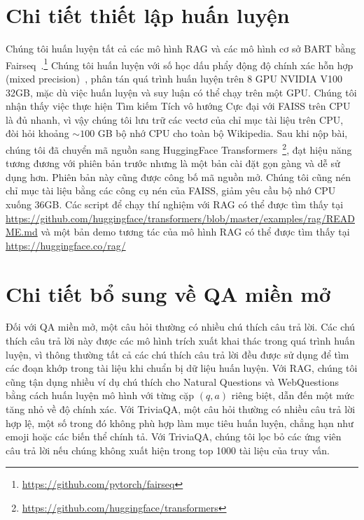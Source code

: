 \documentclass[10pt,letterpaper]{article}
\newcounter{tnote}
\begin{document}
\section{Chi tiết thiết lập huấn luyện}

Chúng tôi huấn luyện tất cả các mô hình RAG và các mô hình cơ sở BART bằng
Fairseq~\cite{b45}.\footnote{\url{https://github.com/pytorch/fairseq}} Chúng
tôi huấn luyện với số học dấu phẩy động độ chính xác hỗn hợp (mixed
precision)~\cite{b40}, phân tán quá trình huấn luyện trên 8 GPU NVIDIA V100
32GB, mặc dù việc huấn luyện và suy luận có thể chạy trên một GPU. Chúng tôi
nhận thấy việc thực hiện Tìm kiếm Tích vô hướng Cực đại với FAISS trên CPU là
đủ nhanh, vì vậy chúng tôi lưu trữ các vectơ của chỉ mục tài liệu trên CPU, đòi
hỏi khoảng ${\sim}100$ GB bộ nhớ CPU cho toàn bộ Wikipedia. Sau khi nộp bài,
chúng tôi đã chuyển mã nguồn sang HuggingFace
Transformers~\cite{b66}\footnote{\url{https://github.com/huggingface/transformers}},
đạt hiệu năng tương đương với phiên bản trước nhưng là một bản cài đặt gọn gàng
và dễ sử dụng hơn. Phiên bản này cũng được công bố mã nguồn mở. Chúng tôi cũng
nén chỉ mục tài liệu bằng các công cụ nén của FAISS, giảm yêu cầu bộ nhớ CPU
xuống 36GB. Các script để chạy thí nghiệm với RAG có thể được tìm thấy tại
\url{https://github.com/huggingface/transformers/blob/master/examples/rag/README.md}
và một bản demo tương tác của mô hình RAG có thể được tìm thấy tại
\url{https://huggingface.co/rag/}

\section{Chi tiết bổ sung về QA miền mở}
\label{app:odqa}

Đối với QA miền mở, một câu hỏi thường có nhiều chú thích câu trả lời. Các chú
thích câu trả lời này được các mô hình trích xuất khai thác trong quá trình
huấn luyện, vì thông thường tất cả các chú thích câu trả lời đều được sử dụng
để tìm các đoạn khớp trong tài liệu khi chuẩn bị dữ liệu huấn luyện. Với RAG,
chúng tôi cũng tận dụng nhiều ví dụ chú thích cho Natural Questions và
WebQuestions bằng cách huấn luyện mô hình với từng cặp $(q,a)$ riêng biệt, dẫn
đến một mức tăng nhỏ về độ chính xác. Với TriviaQA, một câu hỏi thường có nhiều
câu trả lời hợp lệ, một số trong đó không phù hợp làm mục tiêu huấn luyện,
chẳng hạn như emoji hoặc các biến thể chính tả. Với TriviaQA, chúng tôi lọc bỏ
các ứng viên câu trả lời nếu chúng không xuất hiện trong top 1000 tài liệu của
truy vấn.
\end{document}
